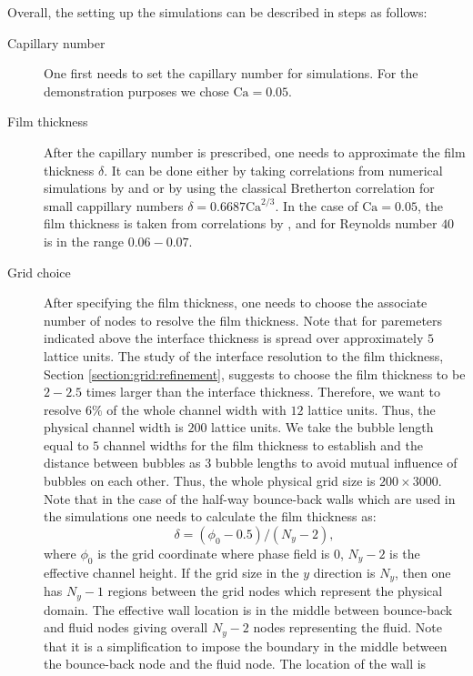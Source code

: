 \documentclass[preprint,12pt]{elsarticle}
\newcommand{\Ca}{\mathrm{Ca}}
\begin{document}
{Overall, the setting up the simulations can be described in steps as follows:
\begin{description}
 \item[Capillary number] One first needs to set the capillary number for
simulations. For the demonstration purposes we chose $\Ca=0.05$. 
 \item[Film thickness] After the capillary number is prescribed, one needs to approximate the film
thickness $\delta$. It can be done either by taking correlations from numerical simulations by
\citet{heil-bretherton} and \citet{giavedoni-numerical} or by using the classical Bretherton
correlation for small cappillary numbers $\delta=0.6687 \Ca^{2/3}$. In the case of $\Ca=0.05$, the 
film thickness is taken from correlations by \citet{heil-bretherton} 
, and for Reynolds number $40$ is in the range $0.06-0.07$.  
\item[Grid choice] After specifying the film thickness, one needs to choose the associate
number of nodes to resolve the film thickness. Note that for paremeters indicated above the
interface thickness is spread over approximately $5$ lattice units. The study of the interface
resolution to the film thickness, Section \ref{section:grid:refinement}, suggests to choose the
film thickness to be $2-2.5$ times larger than the interface thickness. Therefore, we want to
  resolve $6\%$ of the whole channel width with $12$ lattice units.  Thus, the physical channel
  width is $200$ lattice units. We take the bubble length equal to $5$ channel widths for the film
thickness to establish
  and the distance between bubbles as $3$ bubble lengths to avoid mutual influence of bubbles on
each other. Thus, the whole physical grid size is $200 \times 3000$. Note that in the case of the
half-way bounce-back walls \cite{yu} which are used in the
simulations one needs to calculate the film thickness as:
\begin{equation}
\delta=(\phi_0-0.5)/(N_y-2),
\end{equation}
where $\phi_0$ is the grid coordinate where phase field is $0$, $N_y-2$
is the effective channel height.
If the grid size in the $y$ direction is $N_y$, then one has $N_y-1$ regions between the grid nodes
which represent
the physical domain. The effective wall location is in the middle between bounce-back and fluid
nodes giving
overall $N_y-2$ nodes representing the fluid. Note that it is a simplification to impose the
boundary in the middle between the bounce-back
node and the fluid node. The location of the wall is

\end{description}}
\end{document}
